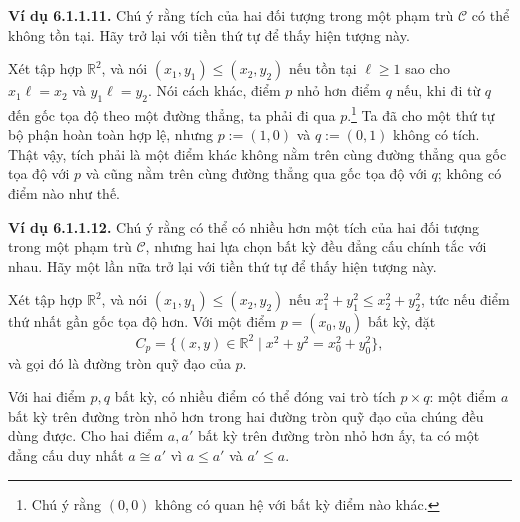 \noindent\textbf{Ví dụ 6.1.1.11.} Chú ý rằng tích của hai đối tượng trong một phạm trù $\mathcal C$ có thể không tồn tại. Hãy trở lại với tiền thứ tự để thấy hiện tượng này.

Xét tập hợp $\mathbb R^2$, và nói $(x_1,y_1)\le(x_2,y_2)$ nếu tồn tại $\ell\ge1$ sao cho $x_1\ell=x_2$ và $y_1\ell=y_2$. Nói cách khác, điểm $p$ nhỏ hơn điểm $q$ nếu, khi đi từ $q$ đến gốc tọa độ theo một đường thẳng, ta phải đi qua $p$.\footnote{Chú ý rằng $(0,0)$ không có quan hệ với bất kỳ điểm nào khác.} Ta đã cho một thứ tự bộ phận hoàn toàn hợp lệ, nhưng $p:=(1,0)$ và $q:=(0,1)$ không có tích. Thật vậy, tích phải là một điểm khác không nằm trên cùng đường thẳng qua gốc tọa độ với $p$ và cũng nằm trên cùng đường thẳng qua gốc tọa độ với $q$; không có điểm nào như thế.

\noindent\textbf{Ví dụ 6.1.1.12.} Chú ý rằng có thể có nhiều hơn một tích của hai đối tượng trong một phạm trù $\mathcal C$, nhưng hai lựa chọn bất kỳ đều đẳng cấu chính tắc với nhau. Hãy một lần nữa trở lại với tiền thứ tự để thấy hiện tượng này.

Xét tập hợp $\mathbb R^2$, và nói $(x_1,y_1)\le(x_2,y_2)$ nếu $x_1^2+y_1^2\le x_2^2+y_2^2$, tức nếu điểm thứ nhất gần gốc tọa độ hơn. Với một điểm $p=(x_0,y_0)$ bất kỳ, đặt
\[C_p=\{(x,y)\in\mathbb R^2\mid x^2+y^2=x_0^2+y_0^2\},\]
và gọi đó là đường tròn quỹ đạo của $p$.

Với hai điểm $p,q$ bất kỳ, có nhiều điểm có thể đóng vai trò tích $p\times q$: một điểm $a$ bất kỳ trên đường tròn nhỏ hơn trong hai đường tròn quỹ đạo của chúng đều dùng được. Cho hai điểm $a,a'$ bất kỳ trên đường tròn nhỏ hơn ấy, ta có một đẳng cấu duy nhất $a\cong a'$ vì $a\le a'$ và $a'\le a$.

